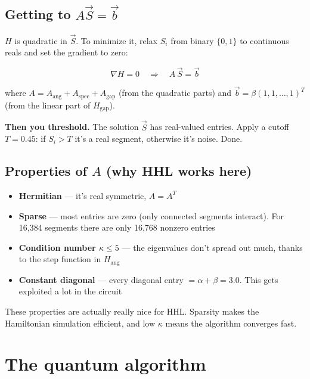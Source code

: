 \documentclass[11pt, a4paper]{article}
\begin{document}
\subsection{Getting to $A\vec{S} = \vec{b}$}
\label{sec:linearsys}

$H$ is quadratic in $\vec{S}$. To minimize it, relax $S_i$ from binary
$\{0,1\}$ to continuous reals and set the gradient to zero:

\begin{equation}
  \nabla H = 0 \quad\Longrightarrow\quad A\,\vec{S} = \vec{b}
\end{equation}

where $A = A_{\text{ang}} + A_{\text{spec}} + A_{\text{gap}}$ (from the
quadratic parts) and $\vec{b} = \beta(1,1,\ldots,1)^T$ (from the linear
part of $H_{\text{gap}}$).

\begin{tcolorbox}[nb]
\textbf{Then you threshold.} The solution $\vec{S}$ has real-valued entries.
Apply a cutoff $T = 0.45$: if $S_i > T$ it's a real segment, otherwise
it's noise. Done.
\end{tcolorbox}

\subsection{Properties of $A$ (why HHL works here)}

\begin{itemize}
  \item \textbf{Hermitian} --- it's real symmetric, $A = A^T$
  \item \textbf{Sparse} --- most entries are zero (only connected segments
        interact). For 16,384 segments there are only 16,768 nonzero entries
  \item \textbf{Condition number $\kappa \leq 5$} --- the eigenvalues don't
        spread out much, thanks to the step function in $H_{\text{ang}}$
  \item \textbf{Constant diagonal} --- every diagonal entry $= \alpha +
        \beta = 3.0$. This gets exploited a lot in the circuit
\end{itemize}

These properties are actually really nice for HHL. Sparsity makes the
Hamiltonian simulation efficient, and low $\kappa$ means the algorithm
converges fast.

\newpage
\section{The quantum algorithm}
\end{document}
